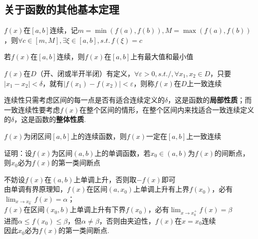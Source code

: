 \subsection{关于函数的其他基本定理}
\begin{theorem}[连续函数介值定理]
\par $f(x)$在$[a,b]$连续，记$m=\min(f(a),f(b)),M=\max(f(a),f(b))$，则$\forall c\in[m,M],\exists \xi\in[a,b],s.t.\,f(\xi)=c$
\end{theorem}
\begin{theorem}[闭区间连续函数最值定理]
若$f(x)$在$[a,b]$连续，则$f(x)$在$[a,b]$上有最大值和最小值
\end{theorem}
\begin{definition}[一致连续]
$f(x)$在$D$（开、闭或半开半闭）有定义，$\forall \varepsilon>0,s.t./,\forall x_1,x_2\in D$，只要$|x_1-x_2|<\delta$，就有$|f(x_1)-f(x_2)|<\varepsilon$，则称$f(x)$在$D$上一致连续
\end{definition}
连续性只需考虑区间的每一点是否有适合连续定义的$\delta$，这是函数的\textbf{局部性质}；而一致连续性要考虑$f(x)$在整个区间的情形，在整个区间内来找适合一致连续定义的$\delta$，这是函数的\textbf{整体性质}.
\begin{theorem}[康托(Cantor)定理]
$f(x)$为闭区间$[a,b]$上的连续函数，则$f(x)$一定在$[a,b]$上一致连续
\end{theorem}
\begin{example}
\label{conti1}
证明：设$f(x)$为区间$(a,b)$上的单调函数，若$x_0\in(a,b)$为$f(x)$的间断点，则$x_0$必为$f(x)$的第一类间断点
\end{example}
\begin{analysis}
不妨设$f(x)$在$(a,b)$上单调上升，否则取$-f(x)$即可\\
由单调有界原理知，$f(x)$在区间$(a,x_0)$上单调上升有上界$f(x_0)$，必有$\displaystyle\lim_{x\to x_0^-}f(x)=\alpha$；\\
$f(x)$在区间$(x_0,b)$上单调上升有下界$f(x_0)$，必有$\displaystyle\lim_{x\to x_0^+}f(x)=\beta$\\
进而$\alpha\leq f(x_0)\leq\beta$，但$\alpha\ne\beta$，否则由夹迫性，$f(x)$在$x=x_0$连续\\
因此$x_0$必为$f(x)$的第一类间断点.
\end{analysis}